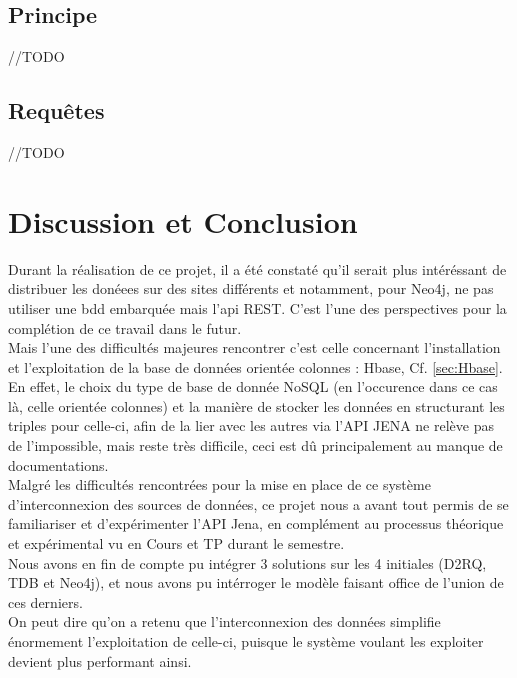 \documentclass{article}
\begin{document}
\subsection{Principe}
//TODO

\subsection{Requêtes}

//TODO


\section{Discussion et Conclusion }
Durant la réalisation de ce projet, il a été constaté qu'il serait plus intéréssant de distribuer les donéees sur des sites différents et notamment, pour Neo4j, ne pas utiliser une bdd embarquée mais l'api REST. C'est l'une des perspectives pour la complétion de ce travail dans le futur.\\

Mais l'une des difficultés majeures rencontrer c'est celle concernant l'installation et l'exploitation de la base de données orientée colonnes : Hbase, Cf. \ref{sec:Hbase}.\\
En effet, le choix du type de base de donnée NoSQL (en l'occurence dans ce cas là, celle orientée colonnes) et la manière de stocker les données en structurant les triples pour celle-ci,  afin de la lier avec les autres via l'API JENA ne relève pas de l'impossible, mais reste très difficile, ceci est dû principalement au manque de documentations.\\
Malgré les difficultés rencontrées pour la mise en place de ce système d'interconnexion des sources de données, ce projet nous a avant tout permis de se familiariser et d'expérimenter l'API Jena, en complément au processus théorique et expérimental vu en Cours et TP durant le semestre.\\
Nous avons en fin de compte pu intégrer 3 solutions sur les 4 initiales (D2RQ, TDB et Neo4j), et nous avons pu intérroger le modèle faisant office de l'union de ces derniers.\\
On peut dire qu'on a retenu que l'interconnexion des données simplifie énormement l'exploitation de celle-ci, puisque le système voulant les exploiter devient plus performant ainsi.
\end{document}
